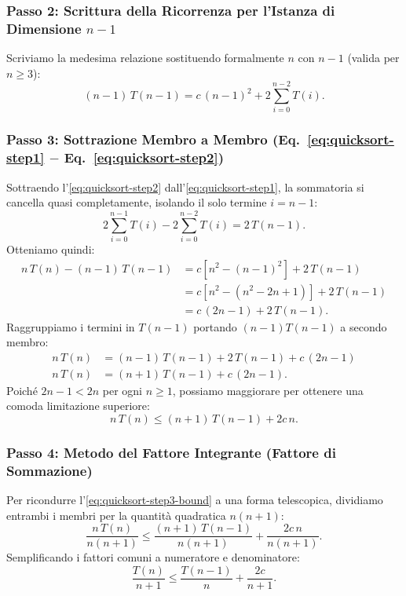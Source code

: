 \subsubsection{Passo 2: Scrittura della Ricorrenza per l'Istanza di Dimensione $n - 1$}
Scriviamo la medesima relazione sostituendo formalmente $n$ con $n - 1$ (valida per $n \ge 3$):
\begin{equation}
  (n - 1) \, T(n - 1) = c \, (n - 1)^2 + 2 \sum_{i=0}^{n - 2} T(i).
  \label{eq:quicksort-step2}
\end{equation}

\subsubsection{Passo 3: Sottrazione Membro a Membro (Eq.~\ref{eq:quicksort-step1} $-$ Eq.~\ref{eq:quicksort-step2})}
Sottraendo l'\autoref{eq:quicksort-step2} dall'\autoref{eq:quicksort-step1}, la sommatoria si cancella quasi completamente, isolando il solo termine $i = n - 1$:
\begin{equation}
  2 \sum_{i=0}^{n-1} T(i) - 2 \sum_{i=0}^{n-2} T(i) = 2 \, T(n - 1).
\end{equation}
Otteniamo quindi:
\begin{align}
  n \, T(n) - (n - 1) \, T(n - 1) &= c \left[ n^2 - (n - 1)^2 \right] + 2 \, T(n - 1) \\
  &= c \left[ n^2 - (n^2 - 2n + 1) \right] + 2 \, T(n - 1) \\
  &= c \, (2n - 1) + 2 \, T(n - 1).
\end{align}
Raggruppiamo i termini in $T(n - 1)$ portando $(n - 1) T(n - 1)$ a secondo membro:
\begin{align}
  n \, T(n) &= (n - 1) \, T(n - 1) + 2 \, T(n - 1) + c \, (2n - 1) \\
  n \, T(n) &= (n + 1) \, T(n - 1) + c \, (2n - 1).
\end{align}
Poiché $2n - 1 < 2n$ per ogni $n \ge 1$, possiamo maggiorare per ottenere una comoda limitazione superiore:
\begin{equation}
  n \, T(n) \le (n + 1) \, T(n - 1) + 2c \, n.
  \label{eq:quicksort-step3-bound}
\end{equation}

\subsubsection{Passo 4: Metodo del Fattore Integrante (Fattore di Sommazione)}
Per ricondurre l'\autoref{eq:quicksort-step3-bound} a una forma telescopica, dividiamo entrambi i membri per la quantità quadratica $n (n + 1)$:
\begin{equation}
  \frac{n \, T(n)}{n (n + 1)} \le \frac{(n + 1) \, T(n - 1)}{n (n + 1)} + \frac{2c \, n}{n (n + 1)}.
\end{equation}
Semplificando i fattori comuni a numeratore e denominatore:
\begin{equation}
  \frac{T(n)}{n + 1} \le \frac{T(n - 1)}{n} + \frac{2c}{n + 1}.
  \label{eq:quicksort-integrating-factor}
\end{equation}

